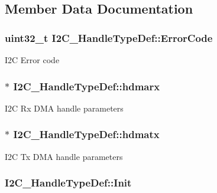 \subsection{Member Data Documentation}
\hypertarget{struct_i2_c___handle_type_def_a15acfdb4bc2e1da9470e9823f127d8f9}{
\subsubsection[{Error\-Code}]{ uint32\-\_\-t I2\-C\-\_\-\-Handle\-Type\-Def\-::\-Error\-Code}}\label{struct_i2_c___handle_type_def_a15acfdb4bc2e1da9470e9823f127d8f9}
I2\-C Error code \hypertarget{struct_i2_c___handle_type_def_ad1778574d987009683c8120bd16aa9cf}{
\subsubsection[{hdmarx}]{$\ast$ I2\-C\-\_\-\-Handle\-Type\-Def\-::hdmarx}}\label{struct_i2_c___handle_type_def_ad1778574d987009683c8120bd16aa9cf}
I2\-C Rx D\-M\-A handle parameters \hypertarget{struct_i2_c___handle_type_def_adb4429cdf02e5564464a1517229826b6}{
\subsubsection[{hdmatx}]{$\ast$ I2\-C\-\_\-\-Handle\-Type\-Def\-::hdmatx}}\label{struct_i2_c___handle_type_def_adb4429cdf02e5564464a1517229826b6}
I2\-C Tx D\-M\-A handle parameters \hypertarget{struct_i2_c___handle_type_def_a86c7e0e7be29686399208f9bb07ae2a2}{
\subsubsection[{Init}]{ I2\-C\-\_\-\-Handle\-Type\-Def\-::\-Init}}\label{struct_i2_c___handle_type_def_a86c7e0e7be29686399208f9bb07ae2a2}
